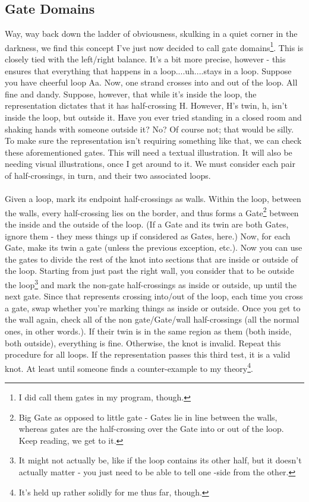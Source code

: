 \documentclass[twoside]{report}
\begin{document}
\subsection{Gate Domains}

Way, way back down the ladder of obviousness, skulking in a quiet corner in the darkness, we find this concept I've just now decided to call gate domains\footnote{I did call them gates in my program, though.}.  This is closely tied with the left/right balance.  It's a bit more precise, however - this ensures that everything that happens in a loop....uh....stays in a loop.  Suppose you have cheerful loop Aa.  Now, one strand crosses into and out of the loop.  All fine and dandy.  Suppose, however, that while it's inside the loop, the representation dictates that it has half-crossing H.  However, H's twin, h, isn't inside the loop, but outside it.  Have you ever tried standing in a closed room and shaking hands with someone outside it?  No?  Of course not; that would be silly.  To make sure the representation isn't requiring something like that, we can check these aforementioned gates.  This will need a textual illustration.  It will also be needing visual illustrations, once I get around to it.  We must consider each pair of half-crossings, in turn, and their two associated loops.\\\\

Given a loop, mark its endpoint half-crossings as walls.  Within the loop, between the walls, every half-crossing lies on the border, and thus forms a Gate\footnote{Big Gate as opposed to little gate - Gates lie in line between the walls, whereas gates are the half-crossing over the Gate into or out of the loop.  Keep reading, we get to it.} between the inside and the outside of the loop.  (If a Gate and its twin are both Gates, ignore them - they mess things up if considered as Gates, here.)  Now, for each Gate, make its twin a gate (unless the previous exception, etc.).  Now you can use the gates to divide the rest of the knot into sections that are inside or outside of the loop.  Starting from just past the right wall, you consider that to be outside the loop\footnote{It might not actually be, like if the loop contains its other half, but it doesn't actually matter - you just need to be able to tell one -side from the other.} and mark the non-gate half-crossings as inside or outside, up until the next gate.  Since that represents crossing into/out of the loop, each time you cross a gate, swap whether you're marking things as inside or outside.  Once you get to the wall again, check all of the non gate/Gate/wall half-crossings (all the normal ones, in other words.).  If their twin is in the same region as them (both inside, both outside), everything is fine.  Otherwise, the knot is invalid.  Repeat this procedure for all loops.  If the representation passes this third test, it is a valid knot.  At least until someone finds a counter-example to my theory\footnote{It's held up rather solidly for me thus far, though.}.
\end{document}
